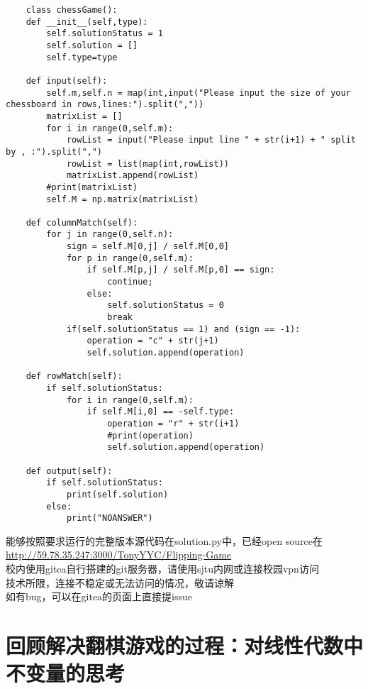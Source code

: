 \documentclass[UTF-8,a4paper]{ctexart}
\begin{document}
\begin{verbatim}
    class chessGame():
    def __init__(self,type):
        self.solutionStatus = 1
        self.solution = []
        self.type=type

    def input(self):
        self.m,self.n = map(int,input("Please input the size of your chessboard in rows,lines:").split(","))
        matrixList = []
        for i in range(0,self.m):
            rowList = input("Please input line " + str(i+1) + " split by , :").split(",")
            rowList = list(map(int,rowList))
            matrixList.append(rowList)
        #print(matrixList)
        self.M = np.matrix(matrixList)

    def columnMatch(self):
        for j in range(0,self.n):
            sign = self.M[0,j] / self.M[0,0]
            for p in range(0,self.m):
                if self.M[p,j] / self.M[p,0] == sign:
                    continue;
                else:
                    self.solutionStatus = 0
                    break
            if(self.solutionStatus == 1) and (sign == -1):
                operation = "c" + str(j+1)
                self.solution.append(operation)
    
    def rowMatch(self):
        if self.solutionStatus:
            for i in range(0,self.m):
                if self.M[i,0] == -self.type:
                    operation = "r" + str(i+1)
                    #print(operation)
                    self.solution.append(operation)

    def output(self):
        if self.solutionStatus:
            print(self.solution)
        else:
            print("NOANSWER")
\end{verbatim}
能够按照要求运行的完整版本源代码在solution.py中，已经open source在
\\ \url{http://59.78.35.247:3000/TonyYYC/Flipping-Game}
\\校内使用gitea自行搭建的git服务器，请使用sjtu内网或连接校园vpn访问
\\ 技术所限，连接不稳定或无法访问的情况，敬请谅解
\\如有bug，可以在gitea的页面上直接提issue

\part{回顾解决翻棋游戏的过程：对线性代数中不变量的思考}
\end{document}
